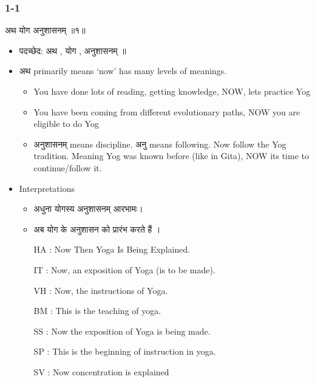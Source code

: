 \begin{frame}[fragile]\frametitle{1-1}

\begin{sanskrit}
अथ योग अनुशासनम् ॥१॥
\end{sanskrit}


	\begin{itemize}
	\item पदच्छेद: अथ , योग , अनुशासनम् ॥
	\item अथ primarily means `now' has many levels of meanings.
		\begin{itemize}
		\item You have done lots of reading, getting knowledge, NOW, lets practice Yog
		\item You have been coming from different evolutionary paths, NOW you are eligible to do Yog
		\item अनुशासनम् means discipline. अनु means following. Now follow the Yog tradition. Meaning Yog was known before (like in Gita), NOW its time to continue/follow it.
		\end{itemize}	
	\item Interpretations
		\begin{itemize}
		\item अधुना योगस्य अनुशासनम् आरभामः।
		\item अब योग के अनुशासन को प्रारंभ करते हैं ।
		\item [HA]: Now Then Yoga Is Being Explained.
		\item [IT]: Now, an exposition of Yoga (is to be made).
		\item [VH]: Now, the instructions of Yoga.
		\item [BM]: This is the teaching of yoga.
		\item [SS]: Now the exposition of Yoga is being made.
		\item [SP]: This is the beginning of instruction in yoga.
		\item [SV]: Now concentration is explained
		\end{itemize}
	\end{itemize}

\end{frame}


